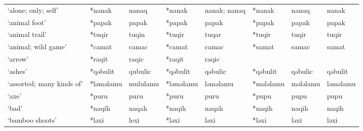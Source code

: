 \begin{landscape}
\begin{longtable}[c]{@{}p{3cm}<{\raggedright}p{2.75cm}<{\raggedright}p{2.75cm}<{\raggedright}p{2.75cm}<{\raggedright}p{2.75cm}<{\raggedright}p{2.75cm}<{\raggedright}p{2.75cm}<{\raggedright}p{2.75cm}<{\raggedright}@{}}
`alone; only; self'                                  & *nanak             & nanaq                          & *nanak             & nanak; nanaq               & *nanak           & nanaq                    & nanak                             \\
`animal foot'                                        & *papak             & papak                          & *papak             & papak                      & *papak           & papak                    & papak                             \\
`animal trail'                                       & *tuqir             & tuqin                          & *tuqir             & tuqar                      & *tuqir           & tuqir                    & tuqir                             \\
`animal; wild game'                                  & *camat             & camac                          & *camat             & camac                      & *samat           & samac                    & samat                             \\
`arrow'                                              & *raqit             & raqic                          & *raqit             & raqic                      &                  &                          &                                   \\
`ashes'                                              & *qəbulit           & qubulic                        & *qəbulit           & qəbulic                    & *qəbulit         & qəbulic                  & qəbulit                           \\
`assorted; many kinds of'                            & *ləməlamu          & mululamu                       & *ləməlamu          & ləməlamu                   & *mələlamu        & mələlamu                 & ləməlamu                          \\
`axe'                                                & *puru              & puru                           & *puru              & puru                       & *pupu            & pupu                     & pupu                              \\
`bad'                                                & *naqih             & naqah                          & *naqih             & naqah                      & *naqih           & naqih                    & naqih                             \\
`bamboo shoots'                                      & *ləxi              & lexi                           & *ləxi              & ləxi                       & *ləxi            & ləxi                     & ləxi                              \\

\end{longtable}
\end{landscape}

